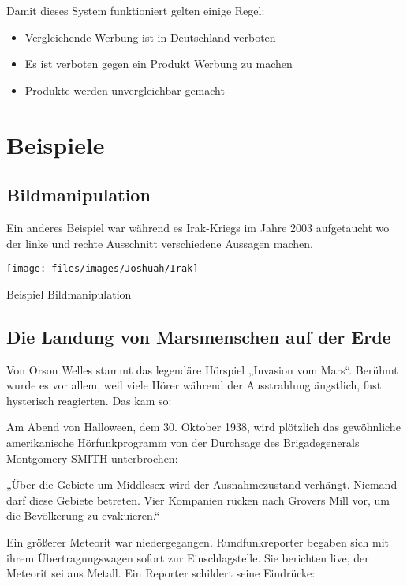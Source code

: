 Damit dieses System funktioniert gelten einige Regel:
\begin{itemize}
	\item Vergleichende Werbung ist in Deutschland verboten
	\item Es ist verboten gegen ein Produkt Werbung zu machen
	\item Produkte werden unvergleichbar gemacht
\end{itemize}


\newpage
\section{Beispiele}
\subsection{Bildmanipulation}
Ein anderes Beispiel war während es Irak-Kriegs im Jahre 2003 aufgetaucht wo der linke und rechte
Ausschnitt verschiedene Aussagen machen.

\begin{figurewrapper}
	\texttt{[image: files/images/Joshuah/Irak]}
	\caption{Beispiel Bildmanipulation}
\end{figurewrapper}


\subsection{Die Landung von Marsmenschen auf der Erde}
Von Orson Welles stammt das legendäre Hörspiel „Invasion vom Mars“. Berühmt wurde es vor allem, weil
viele Hörer während der Ausstrahlung ängstlich, fast hysterisch reagierten. Das kam so:

Am Abend von Halloween, dem 30. Oktober 1938, wird plötzlich das gewöhnliche amerikanische
Hörfunkprogramm von der Durchsage des Brigadegenerals Montgomery SMITH unterbrochen:

„Über die Gebiete um Middlesex wird der Ausnahmezustand verhängt. Niemand darf diese Gebiete
betreten. Vier Kompanien rücken nach Grovers Mill vor, um die Bevölkerung zu evakuieren.“

Ein größerer Meteorit war niedergegangen. Rundfunkreporter begaben sich mit ihrem Übertragungswagen
sofort zur Einschlagstelle. Sie berichten live, der Meteorit sei aus Metall. Ein Reporter schildert
seine Eindrücke:

